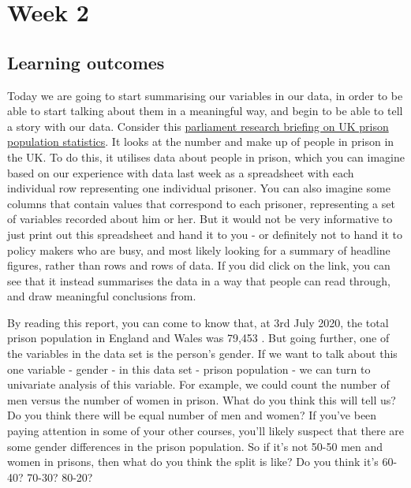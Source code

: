 \documentclass[
]{book}
\begin{document}
\hypertarget{week2}{%
\chapter{Week 2}\label{week2}}

\hypertarget{learning-outcomes-1}{%
\section{Learning outcomes}\label{learning-outcomes-1}}

Today we are going to start summarising our variables in our data, in order to be able to start talking about them in a meaningful way, and begin to be able to tell a story with our data. Consider this \href{http://researchbriefings.files.parliament.uk/documents/SN04334/SN04334.pdf}{parliament research briefing on UK prison population statistics}. It looks at the number and make up of people in prison in the UK. To do this, it utilises data about people in prison, which you can imagine based on our experience with data last week as a spreadsheet with each individual row representing one individual prisoner. You can also imagine some columns that contain values that correspond to each prisoner, representing a set of variables recorded about him or her. But it would not be very informative to just print out this spreadsheet and hand it to you - or definitely not to hand it to policy makers who are busy, and most likely looking for a summary of headline figures, rather than rows and rows of data. If you did click on the link, you can see that it instead summarises the data in a way that people can read through, and draw meaningful conclusions from.

By reading this report, you can come to know that, at 3rd July 2020, the total prison population in England and Wales was 79,453 . But going further, one of the variables in the data set is the person's gender. If we want to talk about this one variable - gender - in this data set - prison population - we can turn to univariate analysis of this variable. For example, we could count the number of men versus the number of women in prison. What do you think this will tell us? Do you think there will be equal number of men and women? If you've been paying attention in some of your other courses, you'll likely suspect that there are some gender differences in the prison population. So if it's not 50-50 men and women in prisons, then what do you think the split is like? Do you think it's 60-40? 70-30? 80-20?
\end{document}
